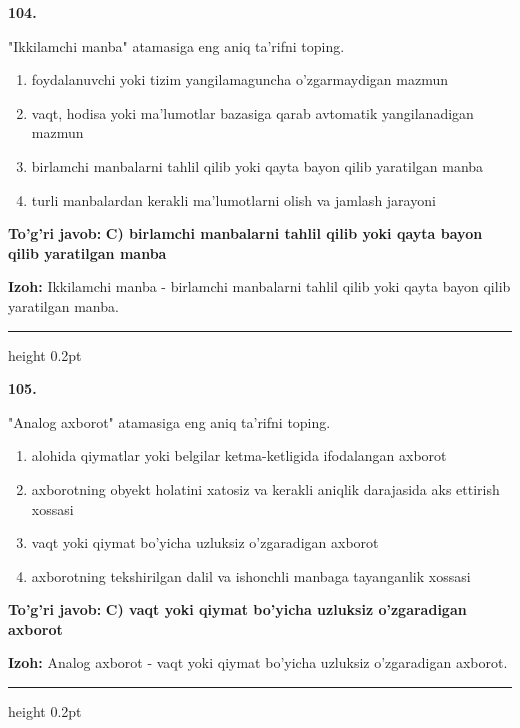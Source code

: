 \documentclass[10pt,a4paper,oneside]{article}
\begin{document}
\noindent\textbf{\color{ink}104.}
\par
"Ikkilamchi manba" atamasiga eng aniq ta'rifni toping.
\begin{enumerate}[label=\Alph*),leftmargin=9mm]
\item foydalanuvchi yoki tizim yangilamaguncha o'zgarmaydigan mazmun
\item vaqt, hodisa yoki ma'lumotlar bazasiga qarab avtomatik yangilanadigan mazmun
\item birlamchi manbalarni tahlil qilib yoki qayta bayon qilib yaratilgan manba
\item turli manbalardan kerakli ma'lumotlarni olish va jamlash jarayoni
\end{enumerate}
\begin{tcolorbox}[enhanced,breakable,colback=teal!4,colframe=teal!50!black,boxrule=0.5pt,arc=1.1mm,left=3mm,right=3mm,top=1.7mm,bottom=1.7mm,before skip=2mm,after skip=2mm]
\textbf{\color{teal}To'g'ri javob:} \textbf{C) birlamchi manbalarni tahlil qilib yoki qayta bayon qilib yaratilgan manba}
\par\smallskip
\textbf{Izoh:} Ikkilamchi manba - birlamchi manbalarni tahlil qilib yoki qayta bayon qilib yaratilgan manba.
\end{tcolorbox}
\vspace{2mm}\hrule height 0.2pt \vspace{3mm}

\noindent\textbf{\color{ink}105.}
\par
"Analog axborot" atamasiga eng aniq ta'rifni toping.
\begin{enumerate}[label=\Alph*),leftmargin=9mm]
\item alohida qiymatlar yoki belgilar ketma-ketligida ifodalangan axborot
\item axborotning obyekt holatini xatosiz va kerakli aniqlik darajasida aks ettirish xossasi
\item vaqt yoki qiymat bo'yicha uzluksiz o'zgaradigan axborot
\item axborotning tekshirilgan dalil va ishonchli manbaga tayanganlik xossasi
\end{enumerate}
\begin{tcolorbox}[enhanced,breakable,colback=teal!4,colframe=teal!50!black,boxrule=0.5pt,arc=1.1mm,left=3mm,right=3mm,top=1.7mm,bottom=1.7mm,before skip=2mm,after skip=2mm]
\textbf{\color{teal}To'g'ri javob:} \textbf{C) vaqt yoki qiymat bo'yicha uzluksiz o'zgaradigan axborot}
\par\smallskip
\textbf{Izoh:} Analog axborot - vaqt yoki qiymat bo'yicha uzluksiz o'zgaradigan axborot.
\end{tcolorbox}
\vspace{2mm}\hrule height 0.2pt \vspace{3mm}
\end{document}
